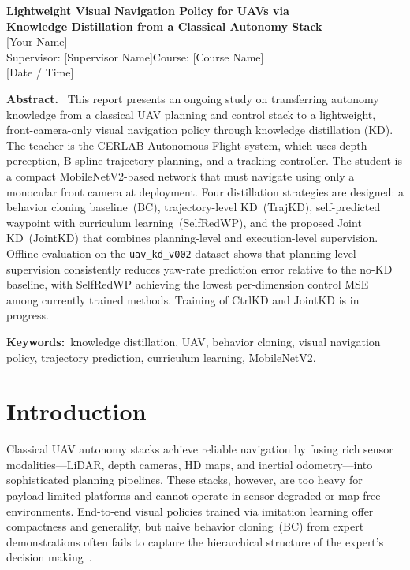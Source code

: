 \documentclass[12pt,a4paper]{article}
\newcommand{\MyName}{[Your Name]}
\newcommand{\MySupervisor}{[Supervisor Name]}
\newcommand{\MyCourse}{[Course Name]}
\newcommand{\MyDate}{[Date / Time]}
\newcommand{\MyLocation}{[Location]}
\begin{document}
\begin{center}
  {\LARGE\bfseries Lightweight Visual Navigation Policy for UAVs via\\[4pt]
  Knowledge Distillation from a Classical Autonomy Stack}\\[10pt]
  {\large \MyName}\\[4pt]
  Supervisor: \MySupervisor \quad Course: \MyCourse\\[2pt]
  \MyDate \quad \MyLocation
\end{center}

\vspace{6pt}
\noindent\textbf{Abstract.}~%
This report presents an ongoing study on transferring autonomy knowledge from a
classical UAV planning and control stack to a lightweight, front-camera-only
visual navigation policy through knowledge distillation (KD).
The teacher is the CERLAB Autonomous Flight system, which uses
depth perception, B-spline trajectory planning, and a tracking controller.
The student is a compact MobileNetV2-based network that must navigate using only
a monocular front camera at deployment.
Four distillation strategies are designed: a behavior cloning baseline~(BC),
trajectory-level KD~(TrajKD), self-predicted waypoint with curriculum learning~(SelfRedWP),
and the proposed Joint KD~(JointKD) that combines planning-level and
execution-level supervision.
Offline evaluation on the \texttt{uav\_kd\_v002} dataset shows that
planning-level supervision consistently reduces yaw-rate prediction error
relative to the no-KD baseline, with SelfRedWP achieving the lowest
per-dimension control MSE among currently trained methods.
Training of CtrlKD and JointKD is in progress.

\vspace{4pt}
\noindent\textbf{Keywords:}~knowledge distillation, UAV, behavior cloning,
visual navigation policy, trajectory prediction, curriculum learning, MobileNetV2.

\section{Introduction}

Classical UAV autonomy stacks achieve reliable navigation by fusing rich sensor
modalities---LiDAR, depth cameras, HD maps, and inertial odometry---into
sophisticated planning pipelines.
These stacks, however, are too heavy for payload-limited platforms and cannot
operate in sensor-degraded or map-free environments.
End-to-end visual policies trained via imitation learning offer compactness and
generality, but naive behavior cloning~(BC) from expert demonstrations often
fails to capture the hierarchical structure of the expert's decision making~\cite{Ross2011}.
\end{document}
